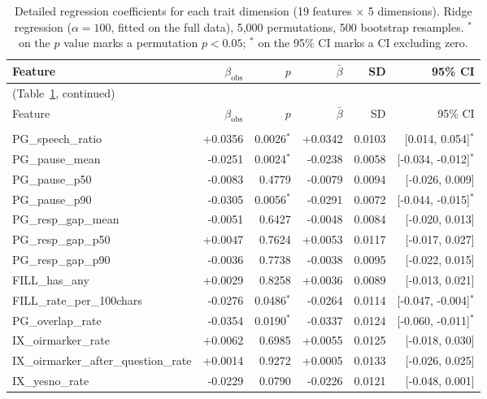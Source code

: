 \begingroup
\footnotesize
\setlength{\tabcolsep}{4pt}
\begin{longtable}{lrrrrr}
\caption{Detailed regression coefficients for each trait dimension (19 features $\times$ 5 dimensions). Ridge regression ($\alpha = 100$, fitted on the full data), 5,000 permutations, 500 bootstrap resamples. $^{*}$ on the $p$ value marks a permutation $p < 0.05$; $^{*}$ on the 95\% CI marks a CI excluding zero.}\label{tab:coef_all5_detail}\\
\toprule
Feature & $\beta_{\mathrm{obs}}$ & $p$ & $\bar{\beta}$ & SD & 95\% CI \\
\midrule
\endfirsthead
\multicolumn{6}{l}{(Table~\ref{tab:coef_all5_detail}, continued)}\\
\toprule
Feature & $\beta_{\mathrm{obs}}$ & $p$ & $\bar{\beta}$ & SD & 95\% CI \\
\midrule
\endhead
\bottomrule
\endlastfoot
\multicolumn{6}{l}{\textit{O}} \\
\quad PG\_speech\_ratio & +0.0356 & 0.0026$^{*}$ & +0.0342 & 0.0103 & [0.014, 0.054]$^{*}$ \\
\quad PG\_pause\_mean & -0.0251 & 0.0024$^{*}$ & -0.0238 & 0.0058 & [-0.034, -0.012]$^{*}$ \\
\quad PG\_pause\_p50 & -0.0083 & 0.4779 & -0.0079 & 0.0094 & [-0.026, 0.009] \\
\quad PG\_pause\_p90 & -0.0305 & 0.0056$^{*}$ & -0.0291 & 0.0072 & [-0.044, -0.015]$^{*}$ \\
\quad PG\_resp\_gap\_mean & -0.0051 & 0.6427 & -0.0048 & 0.0084 & [-0.020, 0.013] \\
\quad PG\_resp\_gap\_p50 & +0.0047 & 0.7624 & +0.0053 & 0.0117 & [-0.017, 0.027] \\
\quad PG\_resp\_gap\_p90 & -0.0036 & 0.7738 & -0.0038 & 0.0095 & [-0.022, 0.015] \\
\quad FILL\_has\_any & +0.0029 & 0.8258 & +0.0036 & 0.0089 & [-0.013, 0.021] \\
\quad FILL\_rate\_per\_100chars & -0.0276 & 0.0486$^{*}$ & -0.0264 & 0.0114 & [-0.047, -0.004]$^{*}$ \\
\quad PG\_overlap\_rate & -0.0354 & 0.0190$^{*}$ & -0.0337 & 0.0124 & [-0.060, -0.011]$^{*}$ \\
\quad IX\_oirmarker\_rate & +0.0062 & 0.6985 & +0.0055 & 0.0125 & [-0.018, 0.030] \\
\quad IX\_oirmarker\_after\_question\_rate & +0.0014 & 0.9272 & +0.0005 & 0.0133 & [-0.026, 0.025] \\
\quad IX\_yesno\_rate & -0.0229 & 0.0790 & -0.0226 & 0.0121 & [-0.048, 0.001] \\

\end{longtable}
